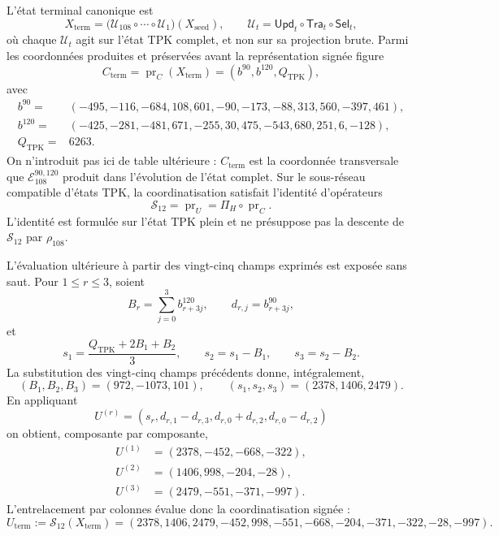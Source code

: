 L'état terminal canonique est
\[
 X_{\mathrm{term}}
 =\bigl(\mathcal U_{108}\circ\cdots\circ\mathcal U_1\bigr)
   (X_{\mathrm{seed}}),
 \qquad
 \mathcal U_t=\mathsf{Upd}_t\circ\mathsf{Tra}_t\circ\mathsf{Sel}_t,
\]
où chaque \(\mathcal U_t\) agit sur l'état TPK complet, et non sur sa projection brute. Parmi les coordonnées produites et préservées avant la représentation signée figure
\[
 C_{\mathrm{term}}=\operatorname{pr}_{C}(X_{\mathrm{term}})
 =(b^{90},b^{120},Q_{\mathrm{TPK}}),
\]
avec
\begin{align*}
 b^{90}={}&(-495,-116,-684,108,601,-90,
              -173,-88,313,560,-397,461),\\
 b^{120}={}&(-425,-281,-481,671,-255,30,
               475,-543,680,251,6,-128),\\
 Q_{\mathrm{TPK}}={}&6263.
\end{align*}
On n'introduit pas ici de table ultérieure : \(C_{\mathrm{term}}\) est la coordonnée transversale que \(\mathcal E_{108}^{90,120}\) produit dans l'évolution de l'état complet. Sur le sous-réseau compatible d'états TPK, la coordinatisation satisfait l'identité d'opérateurs
\begin{equation}
 \mathcal S_{12}=\operatorname{pr}_{U}
 =\Pi_H\circ\operatorname{pr}_{C}.
 \label{eq:registro-identidad-s12-pih}
\end{equation}
L’identité est formulée sur l’état TPK plein et ne présuppose pas la descente
de \(\mathcal S_{12}\) par \(\rho_{108}\).

L'évaluation ultérieure à partir des vingt-cinq champs exprimés est exposée sans saut. Pour \(1\le r\le3\), soient
\[
 B_r=\sum_{j=0}^{3}b^{120}_{r+3j},\qquad
 d_{r,j}=b^{90}_{r+3j},
\]
et
\[
 s_1=\frac{Q_{\mathrm{TPK}}+2B_1+B_2}{3},\qquad
 s_2=s_1-B_1,\qquad s_3=s_2-B_2.
\]
La substitution des vingt-cinq champs précédents donne, intégralement,
\[
 (B_1,B_2,B_3)=(972,-1073,101),\qquad
 (s_1,s_2,s_3)=(2378,1406,2479).
\]
En appliquant
\[
 U^{(r)}=(s_r,d_{r,1}-d_{r,3},d_{r,0}+d_{r,2},d_{r,0}-d_{r,2})
\]
on obtient, composante par composante,
\begin{align*}
 U^{(1)}&=(2378,-452,-668,-322),\\
 U^{(2)}&=(1406,998,-204,-28),\\
 U^{(3)}&=(2479,-551,-371,-997).
\end{align*}
L'entrelacement par colonnes évalue donc la coordinatisation signée :
\begin{equation}
 U_{\mathrm{term}}:=\mathcal S_{12}(X_{\mathrm{term}})
 =(2378,1406,2479,-452,998,-551,-668,-204,-371,-322,-28,-997).
 \label{eq:registro-uterm-desde-estado-pleno}
\end{equation}

